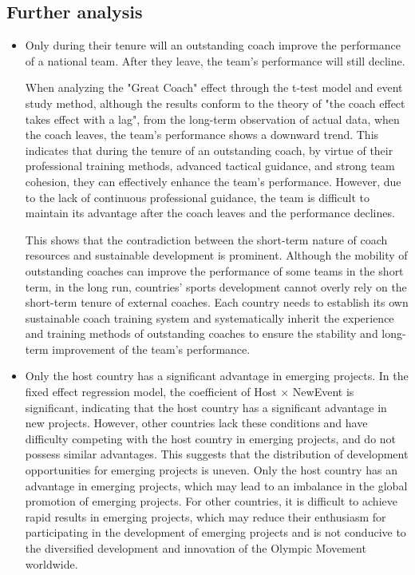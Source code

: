 \documentclass{mcmthesis}  %
\begin{document}
\subsection{Further analysis}
\begin{itemize}  %
\item Only during their tenure will an outstanding coach improve the performance of a national team. After they leave, the team's performance will still decline.

When analyzing the "Great Coach" effect through the t-test model and event study method, although the results conform to the theory of "the coach effect takes effect with a lag", from the long-term observation of actual data, when the coach leaves, the team's performance shows a downward trend. This indicates that during the tenure of an outstanding coach, by virtue of their professional training methods, advanced tactical guidance, and strong team cohesion, they can effectively enhance the team's performance. However, due to the lack of continuous professional guidance, the team is difficult to maintain its advantage after the coach leaves and the performance declines.

This shows that the contradiction between the short-term nature of coach resources and sustainable development is prominent. Although the mobility of outstanding coaches can improve the performance of some teams in the short term, in the long run, countries' sports development cannot overly rely on the short-term tenure of external coaches. Each country needs to establish its own sustainable coach training system and systematically inherit the experience and training methods of outstanding coaches to ensure the stability and long-term improvement of the team's performance.
\item Only the host country has a significant advantage in emerging projects.
In the fixed effect regression model, the coefficient of Host × NewEvent is significant, indicating that the host country has a significant advantage in new projects. However, other countries lack these conditions and have difficulty competing with the host country in emerging projects, and do not possess similar advantages.
This suggests that the distribution of development opportunities for emerging projects is uneven. Only the host country has an advantage in emerging projects, which may lead to an imbalance in the global promotion of emerging projects. For other countries, it is difficult to achieve rapid results in emerging projects, which may reduce their enthusiasm for participating in the development of emerging projects and is not conducive to the diversified development and innovation of the Olympic Movement worldwide.
\end{itemize}  %
\end{document}
